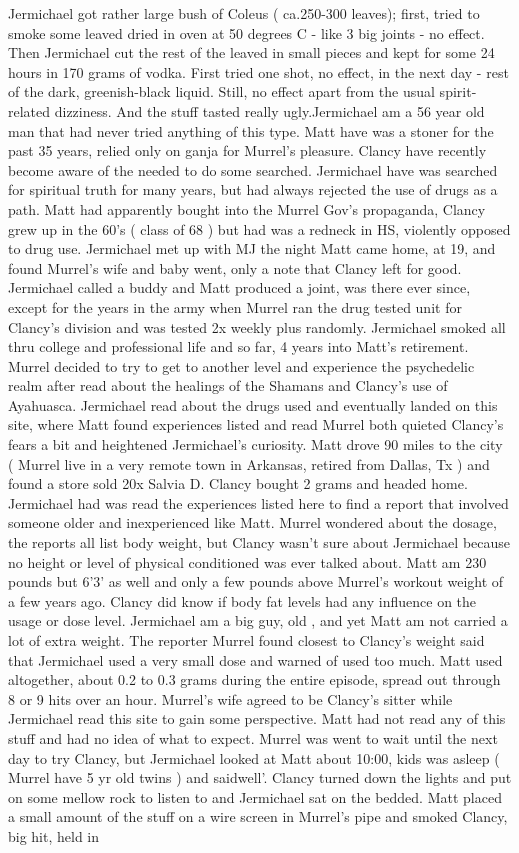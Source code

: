 \documentclass[12pt]{book}
\begin{document}
Jermichael got rather large bush of Coleus ( ca.250-300 leaves); first, tried to smoke some leaved dried in oven at 50 degrees C - like 3 big joints - no effect. Then Jermichael cut the rest of the leaved in small pieces and kept for some 24 hours in 170 grams of vodka. First tried one shot, no effect, in the next day - rest of the dark, greenish-black liquid. Still, no effect apart from the usual spirit-related dizziness. And the stuff tasted really ugly.Jermichael am a 56 year old man that had never tried anything of this type. Matt have was a stoner for the past 35 years, relied only on ganja for Murrel's pleasure. Clancy have recently become aware of the needed to do some searched. Jermichael have was searched for spiritual truth for many years, but had always rejected the use of drugs as a path. Matt had apparently bought into the Murrel Gov's propaganda, Clancy grew up in the 60's (  class of 68 ) but had was a redneck in HS, violently opposed to drug use. Jermichael met up with MJ the night Matt came home, at 19, and found Murrel's wife and baby went, only a note that Clancy left for good. Jermichael called a buddy and Matt produced a joint, was there ever since, except for the years in the army when Murrel ran the drug tested unit for Clancy's division and was tested 2x weekly plus randomly. Jermichael smoked all thru college and professional life and so far, 4 years into Matt's retirement. Murrel decided to try to get to another level and experience the psychedelic realm after read about the healings of the Shamans and Clancy's use of Ayahuasca. Jermichael read about the drugs used and eventually landed on this site, where Matt found experiences listed and read Murrel both quieted Clancy's fears a bit and heightened Jermichael's curiosity. Matt drove 90 miles to the city (  Murrel live in a very remote town in Arkansas, retired from Dallas, Tx ) and found a store sold 20x Salvia D. Clancy bought 2 grams and headed home. Jermichael had was read the experiences listed here to find a report that involved someone older and inexperienced like Matt. Murrel wondered about the dosage, the reports all list body weight, but Clancy wasn't sure about Jermichael because no height or level of physical conditioned was ever talked about. Matt am 230 pounds but 6'3' as well and only a few pounds above Murrel's workout weight of a few years ago. Clancy did know if body fat levels had any influence on the usage or dose level. Jermichael am a big guy, old , and yet Matt am not carried a lot of extra weight. The reporter Murrel found closest to Clancy's weight said that Jermichael used a very small dose and warned of used too much. Matt used altogether, about 0.2 to 0.3 grams during the entire episode, spread out through 8 or 9 hits over an hour. Murrel's wife agreed to be Clancy's sitter while Jermichael read this site to gain some perspective. Matt had not read any of this stuff and had no idea of what to expect. Murrel was went to wait until the next day to try Clancy, but Jermichael looked at Matt about 10:00, kids was asleep (  Murrel have 5 yr old twins ) and saidwell'. Clancy turned down the lights and put on some mellow rock to listen to and Jermichael sat on the bedded. Matt placed a small amount of the stuff on a wire screen in Murrel's pipe and smoked Clancy, big hit, held in 
\end{document}
